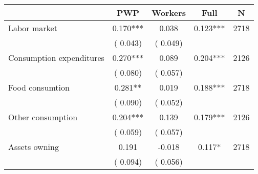 
\begin{tabular}{l*{4}{c}}\hline&\multicolumn{1}{c}{PWP}&\multicolumn{1}{c}{Workers}&\multicolumn{1}{c}{Full}&\multicolumn{1}{c}{N} \\ \hline

 Labor market                       &              0.170*** &         0.038            &              0.123***     & 2718                             \\  
                                       &          (       0.043)               &        (       0.049)                                &                                               &                                               \\      

 Consumption expenditures                       &              0.270*** &         0.089            &              0.204***     & 2126                             \\  
                                       &          (       0.080)               &        (       0.057)                                &                                               &                                               \\      

 Food consumtion                       &              0.281** &         0.019            &              0.188***     & 2718                             \\  
                                       &          (       0.090)               &        (       0.052)                                &                                               &                                               \\      

 Other consumption                       &              0.204*** &         0.139            &              0.179***     & 2126                             \\  
                                       &          (       0.059)               &        (       0.057)                                &                                               &                                               \\      

 Assets owning                       &              0.191 &        -0.018            &              0.117*     & 2718                             \\  
                                       &          (       0.094)               &        (       0.056)                                &                                               &                                               \\      


\end{tabular}
